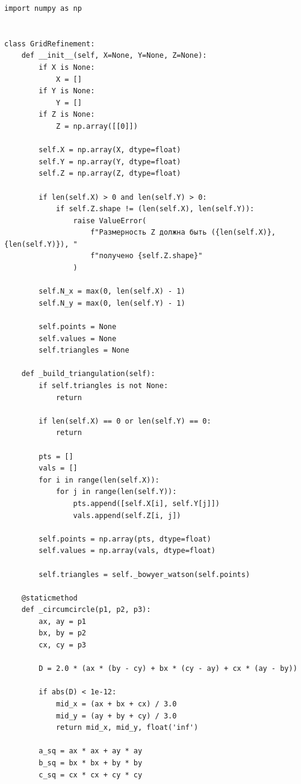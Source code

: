 \documentclass[a4paper, 14pt]{extarticle}
\begin{document}
\newenvironment{longlisting}{\captionsetup{type=listing}}{}
\begin{longlisting}
\caption{Модуль интерполяции на основе триангуляции Делоне}
\begin{verbatim}
import numpy as np


class GridRefinement:
    def __init__(self, X=None, Y=None, Z=None):
        if X is None:
            X = []
        if Y is None:
            Y = []
        if Z is None:
            Z = np.array([[0]])

        self.X = np.array(X, dtype=float)
        self.Y = np.array(Y, dtype=float)
        self.Z = np.array(Z, dtype=float)

        if len(self.X) > 0 and len(self.Y) > 0:
            if self.Z.shape != (len(self.X), len(self.Y)):
                raise ValueError(
                    f"Размерность Z должна быть ({len(self.X)}, {len(self.Y)}), "
                    f"получено {self.Z.shape}"
                )

        self.N_x = max(0, len(self.X) - 1)
        self.N_y = max(0, len(self.Y) - 1)

        self.points = None
        self.values = None
        self.triangles = None

    def _build_triangulation(self):
        if self.triangles is not None:
            return

        if len(self.X) == 0 or len(self.Y) == 0:
            return

        pts = []
        vals = []
        for i in range(len(self.X)):
            for j in range(len(self.Y)):
                pts.append([self.X[i], self.Y[j]])
                vals.append(self.Z[i, j])

        self.points = np.array(pts, dtype=float)
        self.values = np.array(vals, dtype=float)

        self.triangles = self._bowyer_watson(self.points)

    @staticmethod
    def _circumcircle(p1, p2, p3):
        ax, ay = p1
        bx, by = p2
        cx, cy = p3

        D = 2.0 * (ax * (by - cy) + bx * (cy - ay) + cx * (ay - by))

        if abs(D) < 1e-12:
            mid_x = (ax + bx + cx) / 3.0
            mid_y = (ay + by + cy) / 3.0
            return mid_x, mid_y, float('inf')

        a_sq = ax * ax + ay * ay
        b_sq = bx * bx + by * by
        c_sq = cx * cx + cy * cy


\end{verbatim}
\end{longlisting}
\end{document}
